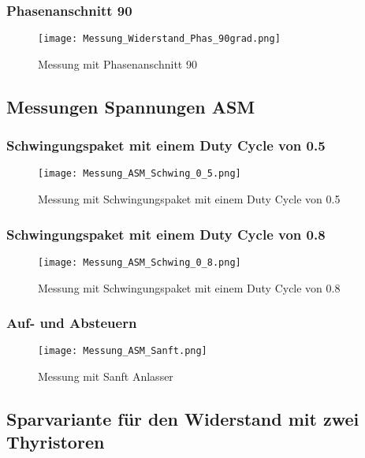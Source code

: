 \begin{appendix}
\subsubsection*{Phasenanschnitt 90\textdegree}
\begin{figure}[ht!]
	\centering
	\texttt{[image: Messung\_Widerstand\_Phas\_90grad.png]}	
	\caption{Messung mit Phasenanschnitt 90\textdegree}\label{fig:Mess_Phas_90}
\end{figure}

\newpage
\subsection{Messungen Spannungen ASM}\label{sec:Mess_Spannung_ASM}
\subsubsection*{Schwingungspaket mit einem Duty Cycle von 0.5}
\begin{figure}[ht!]
	\centering
	\texttt{[image: Messung\_ASM\_Schwing\_0\_5.png]}	
	\caption{Messung mit Schwingungspaket mit einem Duty Cycle von 0.5}\label{fig:Mess_ASM_Schwing_0_5}
\end{figure}

\subsubsection*{Schwingungspaket mit einem Duty Cycle von 0.8}
\begin{figure}[ht!]
	\centering
	\texttt{[image: Messung\_ASM\_Schwing\_0\_8.png]}	
	\caption{Messung mit Schwingungspaket mit einem Duty Cycle von 0.8}\label{fig:Mess_ASM_Schwing_0_8}
\end{figure}
\newpage
\subsubsection*{Auf- und Absteuern}
\begin{figure}[ht!]
	\centering
	\texttt{[image: Messung\_ASM\_Sanft.png]}	
	\caption{Messung mit Sanft Anlasser}\label{fig:Mess_ASM_Sanft}
\end{figure}

\newpage
\subsection{Sparvariante für den Widerstand mit zwei Thyristoren} \label{sec:Sparvariante_2Thyristoren}

\end{appendix}

